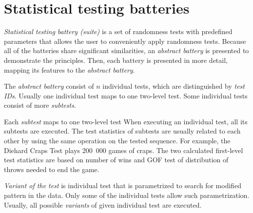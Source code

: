 \documentclass[
  digital,     %
  oneside,     %
  nosansbold,  %
  nocolorbold, %
  nolof,         %
  nolot,         %
]{fithesis4}
\begin{document}
\section{Statistical testing batteries} \label{chap:sols-batteries}



\emph{Statistical testing battery (suite)} is a set of randomness tests with predefined parameters that allows the user to conveniently apply randomness tests. \cite[p. 5]{tu01_guide} Because all of the batteries share significant similarities, an \emph{abstract battery} is presented to demonstrate the principles. Then, each battery is presented in more detail, mapping its features to the \emph{abstract battery}.

The \emph{abstract battery} consist of $n$ individual tests, which are distinguished by \emph{test IDs}. Usually one individual test maps to one two-level test. Some individual tests consist of more \emph{subtests}. 

Each \emph{subtest} maps to one two-level test When executing an individual test, all its subtests are executed. The test statistics of subtests are usually related to each other by using the same operation on the tested sequence. For example, the Diehard Craps Test plays 200~000 games of craps. The two calculated first-level test statistics are based on number of wins and GOF test of distribution of throws needed to end the game. \cite{dieharder_orig}

\emph{Variant of the test} is individual test that is parametrized to search for modified pattern in the data. Only some of the individual tests allow such parametrization. Usually, all possible \emph{variants} of given individual test are executed.  \cite[p. 2]{vavercak}
\end{document}

